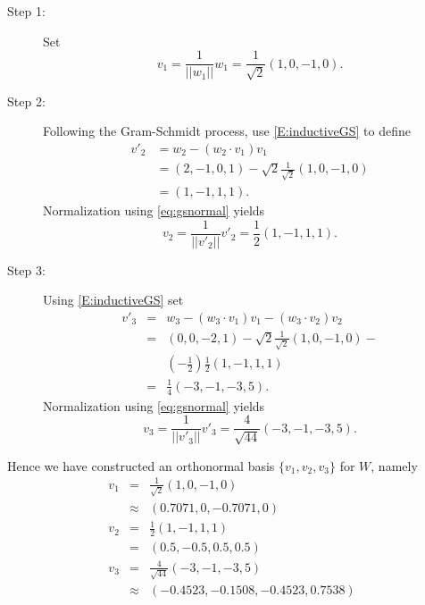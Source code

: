 \documentclass{ximera}
\begin{document}
\begin{description}
\item[Step 1:]   Set
\[
v_1 = \frac{1}{||w_1||}w_1=\frac{1}{\sqrt{2}}(1,0,-1,0).
\]
\item[Step 2:] Following the Gram-Schmidt process, use \eqref{E:inductiveGS} to
define
\begin{align*}
  v'_2 &= w_2-(w_2\cdot v_1)v_1 \\
  &= (2,-1,0,1)-\sqrt{2}\frac{1}{\sqrt{2}}(1,0,-1,0) \\
  &=(1,-1,1,1).
\end{align*}
Normalization using \eqref{eq:gsnormal} yields
\[
v_2 = \frac{1}{||v'_2||}v'_2 = \frac{1}{2}(1,-1,1,1).
\]
\item[Step 3:] Using \eqref{E:inductiveGS} set
\begin{eqnarray*}
v'_3 &=& w_3-(w_3\cdot v_1)v_1-(w_3\cdot v_2)v_2\\
     &=&(0,0,-2,1) - \sqrt{2}\frac{1}{\sqrt{2}}(1,0,-1,0) - \\
         & & \left(-\frac{1}{2}\right)\frac{1}{2}(1,-1,1,1)\\
&=&\frac{1}{4}(-3,-1,-3,5).
\end{eqnarray*}
Normalization using \eqref{eq:gsnormal} yields
\[
v_3 = \frac{1}{||v'_3||}v'_3 = \frac{4}{\sqrt{44}}(-3,-1,-3,5).
\]
\end{description}

Hence we have constructed an orthonormal basis $\{v_1,v_2,v_3\}$ for $W$,
namely
\begin{equation}
\label{eq:gsoresult}
\begin{array}{rcccl}
  v_1 & = & \frac{1}{\sqrt{2}}(1,0,-1,0) \\
      & \approx & (0.7071,0,-0.7071,0)\\
  v_2 & = & \frac{1}{2}(1,-1,1,1) \\
    & = & (0.5,-0.5,0.5,0.5)\\
  v_3 & = & \frac{4}{\sqrt{44}}(-3,-1,-3,5) \\
    & \approx & (-0.4523,-0.1508,-0.4523,0.7538)
\end{array}
\end{equation}




\end{document}
